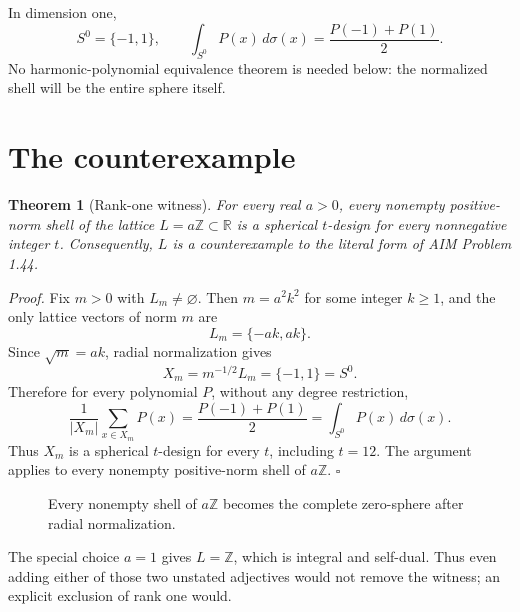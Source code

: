 \documentclass[11pt]{article}
\theoremstyle{argusplain}
\newtheorem{theorem}{Theorem}
\begin{document}
In dimension one,
\[
  S^0=\{-1,1\},
  \qquad
  \int_{S^0}P(x)\,d\sigma(x)=\frac{P(-1)+P(1)}2.
\]
No harmonic-polynomial equivalence theorem is needed below: the normalized shell will be the entire sphere itself.

\section{The counterexample}

\begin{theorem}[Rank-one witness]
For every real $a>0$, every nonempty positive-norm shell of the lattice $L=a\mathbb Z\subset\mathbb R$ is a spherical $t$-design for every nonnegative integer $t$. Consequently, $L$ is a counterexample to the literal form of AIM Problem 1.44.
\end{theorem}

\textit{Proof.}
Fix $m>0$ with $L_m\neq\varnothing$. Then $m=a^2k^2$ for some integer $k\geq1$, and the only lattice vectors of norm $m$ are
\[
  L_m=\{-ak,ak\}.
\]
Since $\sqrt m=ak$, radial normalization gives
\[
  X_m=m^{-1/2}L_m=\{-1,1\}=S^0.
\]
Therefore for every polynomial $P$, without any degree restriction,
\[
  \frac1{|X_m|}\sum_{x\in X_m}P(x)
  =\frac{P(-1)+P(1)}2
  =\int_{S^0}P(x)\,d\sigma(x).
\]
Thus $X_m$ is a spherical $t$-design for every $t$, including $t=12$. The argument applies to every nonempty positive-norm shell of $a\mathbb Z$. \hfill$\square$

\begin{figure}[ht]
\centering
{}
\caption{Every nonempty shell of $a\mathbb Z$ becomes the complete zero-sphere after radial normalization.}
\end{figure}

The special choice $a=1$ gives $L=\mathbb Z$, which is integral and self-dual. Thus even adding either of those two unstated adjectives would not remove the witness; an explicit exclusion of rank one would.
\end{document}
